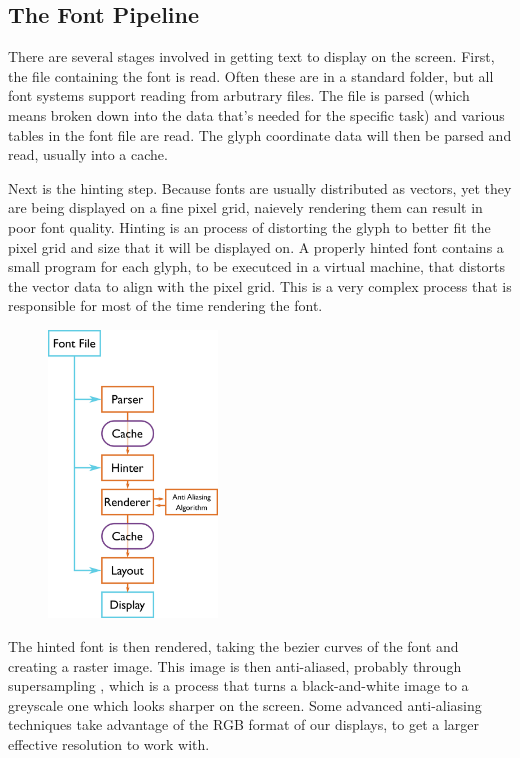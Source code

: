 \documentclass{report}
\begin{document}
\subsection{The Font Pipeline}

There are several stages involved in getting text to display on the screen.
First, the file containing the font is read. Often these are in a standard
folder, but all font systems support reading from arbutrary files. The file is
parsed (which means broken down into the data that's needed for the specific
task) and various tables in the font file are read. The glyph coordinate data
will then be parsed and read, usually into a cache.

Next is the hinting step. Because fonts are usually distributed as vectors, yet
they are being displayed on a fine pixel grid, naievely rendering them can
result in poor font quality. Hinting is an process of distorting the glyph to
better fit the pixel grid and size that it will be displayed on. A properly
hinted font contains a small program for each glyph, to be executced in a
virtual machine, that distorts the vector data to align with the pixel grid.
This is a very complex process that is responsible for most of the time
rendering the font.
\begin{figure}
  \centering
  \includegraphics[width=0.4\textwidth]{fontpipelineimg}
\end{figure}

The hinted font is then rendered, taking the bezier curves of the font and
creating a raster image. This image is then anti-aliased, probably through
supersampling , which is a process that turns a
black-and-white image to a greyscale one which looks sharper on the screen. Some
advanced anti-aliasing techniques take advantage of the RGB format of our
displays, to get a larger effective resolution to work with.
\end{document}
